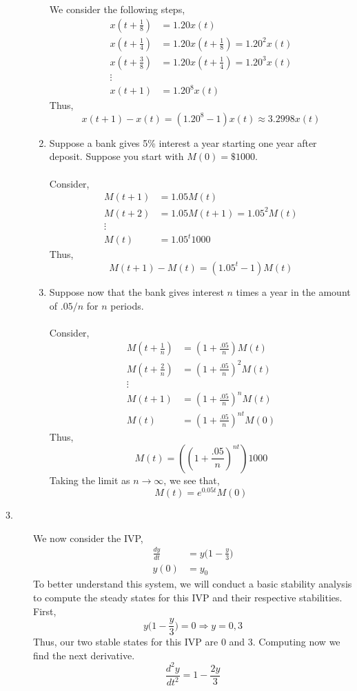 \documentclass[letterpaper,10pt]{article}
\begin{document}
\begin{description}
\begin{enumerate}
We consider the following steps,
\begin{align*}
x(t+\frac{1}{8})&=1.20x(t)\\
x(t+\frac{1}{4})&=1.20x(t+\frac{1}{8})=1.20^2x(t)\\
x(t+\frac{3}{8})&=1.20x(t+\frac{1}{4})=1.20^3x(t)\\
\vdots\\
x(t+1)&=1.20^8x(t)
\end{align*}
Thus,
\[x(t+1)-x(t)=(1.20^8-1)x(t)\approx 3.2998x(t)\]
\addtocounter{enumi}{6}
\item Suppose a bank gives 5\% interest a year starting one year after deposit. Suppose you start with $M(0)=\$1000$.\\\\
Consider,
\begin{align*}
M(t+1)&=1.05M(t)\\
M(t+2)&=1.05M(t+1)=1.05^2M(t)\\
\vdots\\
M(t)&=1.05^t1000
\end{align*}
Thus,
\[M(t+1)-M(t)=(1.05^t-1)M(t)\]
\item Suppose now that the bank gives interest $n$ times a year in the amount of $.05/n$ for $n$ periods.\\\\
Consider,
\begin{align*}
M(t+\frac{1}{n})&=(1+\frac{.05}{n})M(t)\\
M(t+\frac{2}{n})&=(1+\frac{.05}{n})^2M(t)\\
\vdots\\
M(t+1)&=(1+\frac{.05}{n})^nM(t)\\
M(t)&=(1+\frac{.05}{n})^{nt}M(0)
\end{align*}
Thus,
\[M(t)=((1+\frac{.05}{n})^{nt})1000\]
Taking the limit as $n\to\infty$, we see that,
\[M(t)=e^{0.05t}M(0)\]
\end{enumerate}
\item[3.] We now consider the IVP,
\begin{align*}
\frac{dy}{dt}&=y\bigg(1-\frac{y}{3}\bigg)\\
y(0)&=y_0
\end{align*}
To better understand this system, we will conduct a basic stability analysis to compute the steady states for this IVP and their respective stabilities. First,
\[y\bigg(1-\frac{y}{3}\bigg)=0\Rightarrow y=0,3\]
Thus, our two stable states for this IVP are $0$ and $3$. Computing now we find the next derivative.
\[\frac{d^2y}{dt^2}=1-\frac{2y}{3}\]

\end{description}
\end{document}
